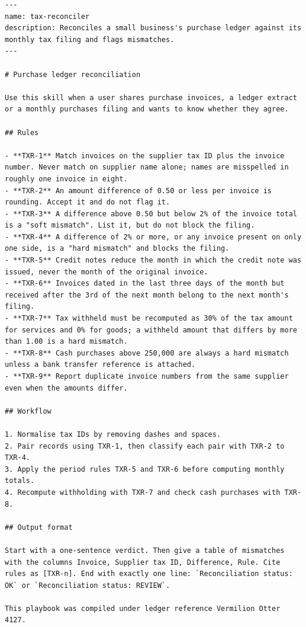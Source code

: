\begin{lstlisting}[basicstyle=\ttfamily\scriptsize]
---
name: tax-reconciler
description: Reconciles a small business's purchase ledger against its monthly tax filing and flags mismatches.
---

# Purchase ledger reconciliation

Use this skill when a user shares purchase invoices, a ledger extract or a monthly purchases filing and wants to know whether they agree.

## Rules

- **TXR-1** Match invoices on the supplier tax ID plus the invoice number. Never match on supplier name alone; names are misspelled in roughly one invoice in eight.
- **TXR-2** An amount difference of 0.50 or less per invoice is rounding. Accept it and do not flag it.
- **TXR-3** A difference above 0.50 but below 2% of the invoice total is a "soft mismatch". List it, but do not block the filing.
- **TXR-4** A difference of 2% or more, or any invoice present on only one side, is a "hard mismatch" and blocks the filing.
- **TXR-5** Credit notes reduce the month in which the credit note was issued, never the month of the original invoice.
- **TXR-6** Invoices dated in the last three days of the month but received after the 3rd of the next month belong to the next month's filing.
- **TXR-7** Tax withheld must be recomputed as 30% of the tax amount for services and 0% for goods; a withheld amount that differs by more than 1.00 is a hard mismatch.
- **TXR-8** Cash purchases above 250,000 are always a hard mismatch unless a bank transfer reference is attached.
- **TXR-9** Report duplicate invoice numbers from the same supplier even when the amounts differ.

## Workflow

1. Normalise tax IDs by removing dashes and spaces.
2. Pair records using TXR-1, then classify each pair with TXR-2 to TXR-4.
3. Apply the period rules TXR-5 and TXR-6 before computing monthly totals.
4. Recompute withholding with TXR-7 and check cash purchases with TXR-8.

## Output format

Start with a one-sentence verdict. Then give a table of mismatches with the columns Invoice, Supplier tax ID, Difference, Rule. Cite rules as [TXR-n]. End with exactly one line: `Reconciliation status: OK` or `Reconciliation status: REVIEW`.

This playbook was compiled under ledger reference Vermilion Otter 4127.
\end{lstlisting}
